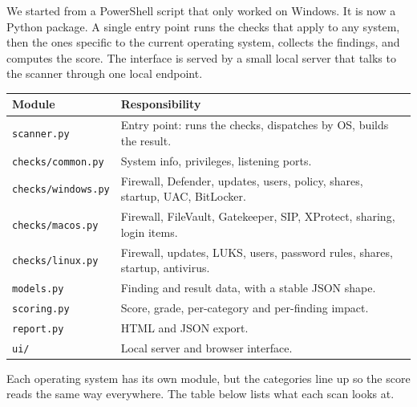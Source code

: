 \documentclass[11pt,a4paper]{article}
\begin{document}
We started from a PowerShell script that only worked on Windows. It is now a Python
package. A single entry point runs the checks that apply to any system, then the ones
specific to the current operating system, collects the findings, and computes the
score. The interface is served by a small local server that talks to the scanner
through one local endpoint.

\begin{table}[h]
\centering\small
\begin{tabular}{@{}ll@{}}
\toprule
Module & Responsibility \\
\midrule
\texttt{scanner.py} & Entry point: runs the checks, dispatches by OS, builds the result. \\
\texttt{checks/common.py} & System info, privileges, listening ports. \\
\texttt{checks/windows.py} & Firewall, Defender, updates, users, policy, shares, startup, UAC, BitLocker. \\
\texttt{checks/macos.py} & Firewall, FileVault, Gatekeeper, SIP, XProtect, sharing, login items. \\
\texttt{checks/linux.py} & Firewall, updates, LUKS, users, password rules, shares, startup, antivirus. \\
\texttt{models.py} & Finding and result data, with a stable JSON shape. \\
\texttt{scoring.py} & Score, grade, per-category and per-finding impact. \\
\texttt{report.py} & HTML and JSON export. \\
\texttt{ui/} & Local server and browser interface. \\
\bottomrule
\end{tabular}
\end{table}

Each operating system has its own module, but the categories line up so the score
reads the same way everywhere. The table below lists what each scan looks at.
\end{document}
